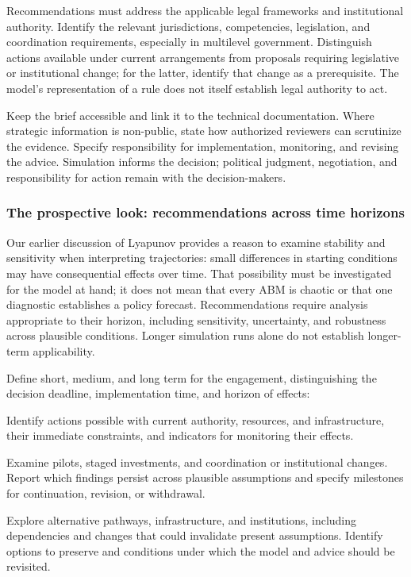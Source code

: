 \documentclass[11pt,a4paper]{article}
\begin{document}
Recommendations must address the applicable legal frameworks and institutional authority. Identify the relevant jurisdictions, competencies, legislation, and coordination requirements, especially in multilevel government. Distinguish actions available under current arrangements from proposals requiring legislative or institutional change; for the latter, identify that change as a prerequisite. The model's representation of a rule does not itself establish legal authority to act.

Keep the brief accessible and link it to the technical documentation. Where strategic information is non-public, state how authorized reviewers can scrutinize the evidence. Specify responsibility for implementation, monitoring, and revising the advice. Simulation informs the decision; political judgment, negotiation, and responsibility for action remain with the decision-makers.

\subsubsection{The prospective look: recommendations across time horizons}

Our earlier discussion of Lyapunov provides a reason to examine stability and sensitivity when interpreting trajectories: small differences in starting conditions may have consequential effects over time. That possibility must be investigated for the model at hand; it does not mean that every ABM is chaotic or that one diagnostic establishes a policy forecast. Recommendations require analysis appropriate to their horizon, including sensitivity, uncertainty, and robustness across plausible conditions. Longer simulation runs alone do not establish longer-term applicability.

Define short, medium, and long term for the engagement, distinguishing the decision deadline, implementation time, and horizon of effects:
\begin{description}[style=nextline,leftmargin=0pt,labelindent=0pt,labelsep=0pt,labelwidth=0pt,itemindent=0pt,itemsep=5pt]
\item[Short term] Identify actions possible with current authority, resources, and infrastructure, their immediate constraints, and indicators for monitoring their effects.
\item[Medium term] Examine pilots, staged investments, and coordination or institutional changes. Report which findings persist across plausible assumptions and specify milestones for continuation, revision, or withdrawal.
\item[Long term] Explore alternative pathways, infrastructure, and institutions, including dependencies and changes that could invalidate present assumptions. Identify options to preserve and conditions under which the model and advice should be revisited.
\end{description}
\end{document}
